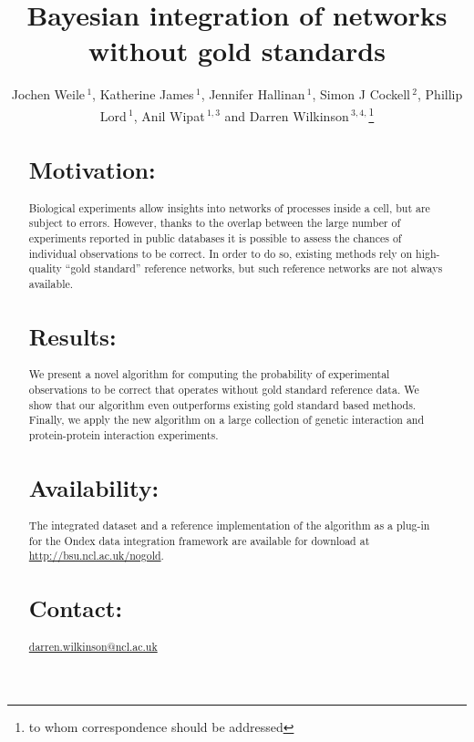 \documentclass{bioinfo}
\begin{document}

\title[Bayesian integration of networks without gold standards]{Bayesian integration of networks without gold standards}

\author[J. Weile \textit{et~al.}]{Jochen Weile\,$^{1}$, Katherine James\,$^{1}$, Jennifer Hallinan\,$^{1}$, Simon J Cockell\,$^{2}$, Phillip Lord\,$^{1}$, Anil Wipat\,$^{1,3}$ and Darren Wilkinson\,$^{3,4,}$\footnote{to whom correspondence should be addressed}}

\address{$^{1}$School of Computing Science, $^{2}$Bioinformatics Support Unit, $^{3}$Centre for Integrative Systems Biology of Ageing and Nutrition, $^{4}$School of Mathematics and Statistics, Newcastle University, Newcastle upon Tyne NE1 7RU, United Kingdom}



\maketitle

\begin{abstract}
\section{Motivation:}
Biological experiments allow insights into networks of processes inside a cell, but are subject to errors. However, thanks to the overlap between the large number of experiments reported in public databases it is possible to assess the chances of individual observations to be correct. In order to do so, existing methods rely on high-quality ``gold standard'' reference networks, but such reference networks are not always available.

\section{Results:}
We present a novel algorithm for computing the probability of experimental observations to be correct that operates without gold standard reference data. We show that our algorithm even outperforms existing gold standard based methods. Finally, we apply the new algorithm on a large collection of genetic interaction and protein-protein interaction experiments.

\section{Availability:}
The integrated dataset and a reference implementation of the algorithm as a plug-in for the Ondex data integration framework are available for download at \href{http://bsu.ncl.ac.uk/nogold}{http://bsu.ncl.ac.uk/nogold}.

\section{Contact:} \href{darren.wilkinson@ncl.ac.uk}{darren.wilkinson@ncl.ac.uk}
\end{abstract}
\end{document}
